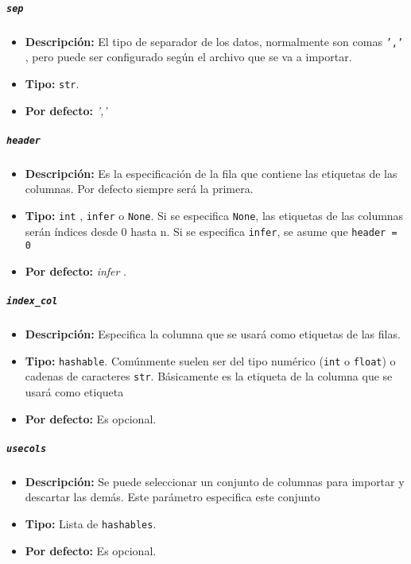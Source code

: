 \subparagraph{\texttt{sep}}

\begin{itemize}
    \item \textbf{Descripción:} El tipo de separador de los datos, normalmente
          son comas \texttt{','} , pero puede ser configurado según el archivo que se va
          a importar.
    \item \textbf{Tipo:} \texttt{str}.
    \item \textbf{Por defecto:} \textit{','}
\end{itemize}

\subparagraph{\texttt{header}}

\begin{itemize}
    \item \textbf{Descripción:} Es la especificación de la fila que contiene
          las etiquetas de las columnas. Por defecto siempre será la primera.
    \item \textbf{Tipo:} \texttt{int} , \texttt{infer} o \texttt{None}. Si se
          especifica \texttt{None}, las etiquetas de las columnas serán índices desde 0
          hasta n. Si se especifica \texttt{infer}, se asume que	\texttt{header = 0}
    \item \textbf{Por defecto:} \textit{infer} .
\end{itemize}

\subparagraph{\texttt{index\_col}}

\begin{itemize}
    \item \textbf{Descripción:} Especifica la columna que se usará como
          etiquetas de las filas.
    \item \textbf{Tipo:} \texttt{hashable}. Comúnmente suelen ser del tipo
          numérico (\texttt{int} o \texttt{float}) o cadenas de caracteres \texttt{str}.
          Básicamente es la etiqueta de la columna que se usará como etiqueta
    \item \textbf{Por defecto:}  Es opcional.
\end{itemize}

\subparagraph{\texttt{usecols}}

\begin{itemize}
    \item \textbf{Descripción:} Se puede seleccionar un conjunto de columnas
          para importar y descartar las demás. Este parámetro especifica este conjunto
    \item \textbf{Tipo:} Lista de \texttt{hashables}.
    \item \textbf{Por defecto:} Es opcional.
\end{itemize}

